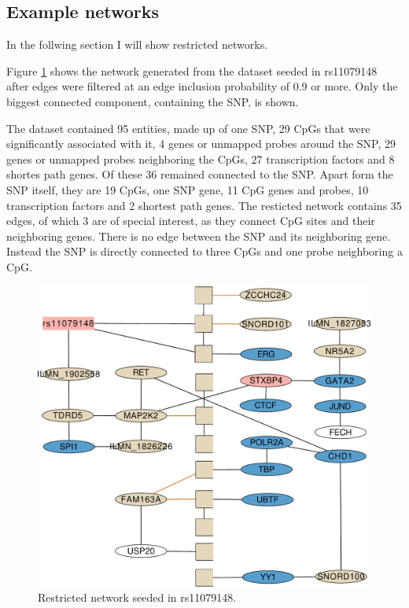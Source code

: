 \documentclass[a4paper,12pt,twoside,openright]{report}
\begin{document}
\subsection{Example networks}
\label{Results:Example networks}
In the follwing section I will show restricted networks. 

Figure \ref{fig:rs11079148.ggm.network} shows the network generated from the dataset seeded in rs11079148 after edges were filtered at an edge inclusion probability of 0.9 or more. Only the biggest connected component, containing the SNP, is shown. 

The dataset contained 95 entities, made up of one SNP, 29 CpGs that were significantly associated with it, 4 genes or unmapped probes around the SNP, 29 genes or unmapped probes neighboring the CpGs, 27 transcription factors and 8 shortes path genes. Of these 36 remained connected to the SNP. Apart form the SNP itself, they are 19 CpGs, one SNP gene, 11 CpG genes and probes, 10 transcription factors and 2 shortest path genes. The resticted network contains 35 edges, of which 3 are of special interest, as they connect CpG sites and their neighboring genes. There is no edge between the SNP and its neighboring gene. Instead the SNP is directly connected to three CpGs and one probe neighboring a CpG. 

\begin{figure}[tb]
	\includegraphics[scale = 0.2, keepaspectratio = true]{"../figures/rs11079148"}  
	\caption{Restricted network seeded in rs11079148. }
    \label{fig:rs11079148.ggm.network}
\end{figure}
\end{document}
